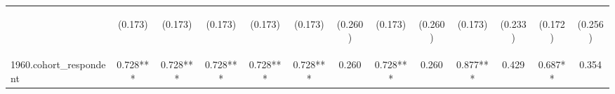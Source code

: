 \begin{center}
\begin{tabular}{lcccccccccccc}
\vspace{4pt} & \begin{footnotesize}(0.173)\end{footnotesize} & \begin{footnotesize}(0.173)\end{footnotesize} & \begin{footnotesize}(0.173)\end{footnotesize} & \begin{footnotesize}(0.173)\end{footnotesize} & \begin{footnotesize}(0.173)\end{footnotesize} & \begin{footnotesize}(0.260)\end{footnotesize} & \begin{footnotesize}(0.173)\end{footnotesize} & \begin{footnotesize}(0.260)\end{footnotesize} & \begin{footnotesize}(0.173)\end{footnotesize} & \begin{footnotesize}(0.233)\end{footnotesize} & \begin{footnotesize}(0.172)\end{footnotesize} & \begin{footnotesize}(0.256)\end{footnotesize} \\
1960.cohort\_respondent & 0.728*** & 0.728*** & 0.728*** & 0.728*** & 0.728*** & 0.260 & 0.728*** & 0.260 & 0.877*** & 0.429 & 0.687** & 0.354 \\

\end{tabular}
\end{center}
